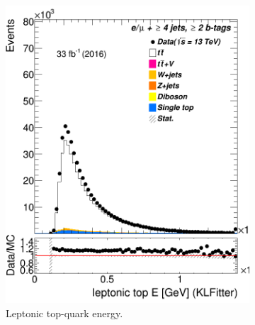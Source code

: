 \begin{figure}
\begin{subfigure}{0.35\textwidth}
		\includegraphics[width=\linewidth]{ControlPlots_emujets_2016_4incl_2incl/klf_topLep_E_emujets_2016.png}
		\caption{Leptonic top-quark energy.} \label{fig:24}
	\end{subfigure}
	\medskip	
	\begin{subfigure}{0.35\textwidth}

\end{subfigure}
\end{figure}
